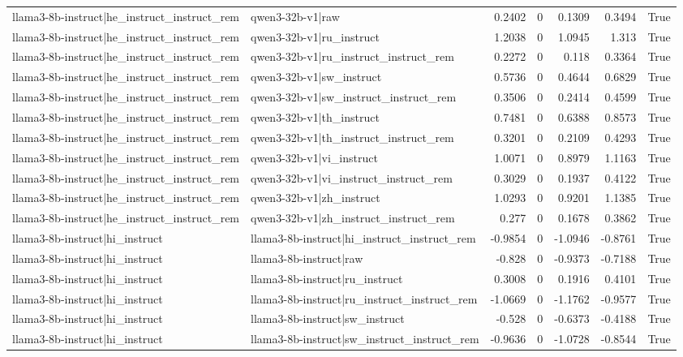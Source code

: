 \begin{table}
\begin{tabular}{l l r r r r l}
llama3-8b-instruct|he_instruct_instruct_rem & qwen3-32b-v1|raw & 0.2402 & 0 & 0.1309 & 0.3494 & True \\
llama3-8b-instruct|he_instruct_instruct_rem & qwen3-32b-v1|ru_instruct & 1.2038 & 0 & 1.0945 & 1.313 & True \\
llama3-8b-instruct|he_instruct_instruct_rem & qwen3-32b-v1|ru_instruct_instruct_rem & 0.2272 & 0 & 0.118 & 0.3364 & True \\
llama3-8b-instruct|he_instruct_instruct_rem & qwen3-32b-v1|sw_instruct & 0.5736 & 0 & 0.4644 & 0.6829 & True \\
llama3-8b-instruct|he_instruct_instruct_rem & qwen3-32b-v1|sw_instruct_instruct_rem & 0.3506 & 0 & 0.2414 & 0.4599 & True \\
llama3-8b-instruct|he_instruct_instruct_rem & qwen3-32b-v1|th_instruct & 0.7481 & 0 & 0.6388 & 0.8573 & True \\
llama3-8b-instruct|he_instruct_instruct_rem & qwen3-32b-v1|th_instruct_instruct_rem & 0.3201 & 0 & 0.2109 & 0.4293 & True \\
llama3-8b-instruct|he_instruct_instruct_rem & qwen3-32b-v1|vi_instruct & 1.0071 & 0 & 0.8979 & 1.1163 & True \\
llama3-8b-instruct|he_instruct_instruct_rem & qwen3-32b-v1|vi_instruct_instruct_rem & 0.3029 & 0 & 0.1937 & 0.4122 & True \\
llama3-8b-instruct|he_instruct_instruct_rem & qwen3-32b-v1|zh_instruct & 1.0293 & 0 & 0.9201 & 1.1385 & True \\
llama3-8b-instruct|he_instruct_instruct_rem & qwen3-32b-v1|zh_instruct_instruct_rem & 0.277 & 0 & 0.1678 & 0.3862 & True \\
llama3-8b-instruct|hi_instruct & llama3-8b-instruct|hi_instruct_instruct_rem & -0.9854 & 0 & -1.0946 & -0.8761 & True \\
llama3-8b-instruct|hi_instruct & llama3-8b-instruct|raw & -0.828 & 0 & -0.9373 & -0.7188 & True \\
llama3-8b-instruct|hi_instruct & llama3-8b-instruct|ru_instruct & 0.3008 & 0 & 0.1916 & 0.4101 & True \\
llama3-8b-instruct|hi_instruct & llama3-8b-instruct|ru_instruct_instruct_rem & -1.0669 & 0 & -1.1762 & -0.9577 & True \\
llama3-8b-instruct|hi_instruct & llama3-8b-instruct|sw_instruct & -0.528 & 0 & -0.6373 & -0.4188 & True \\
llama3-8b-instruct|hi_instruct & llama3-8b-instruct|sw_instruct_instruct_rem & -0.9636 & 0 & -1.0728 & -0.8544 & True \\

\end{tabular}
\end{table}
